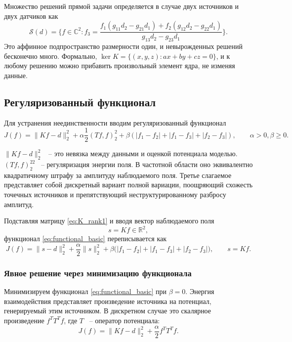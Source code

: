 \documentclass[a4paper,14pt,oneside,openany]{extarticle}
\begin{document}
Множество решений прямой задачи определяется в случае двух источников и двух датчиков как
\begin{equation}\label{eq:data_line}
    \mathcal{S}(d) = \{f\in\mathbb{C}^2: f_3 = \frac{f_1(g_{11}d_2 - g_{21}d_1) + f_2(g_{12}d_2 - g_{22}d_1)}{g_{13}d_2 - g_{23}d_1}\}.
\end{equation}
Это аффинное подпространство размерности один, и невырожденных решений бесконечно много. 
Формально, $\ker K = \{(x,y,z): a x + b y + c z = 0\}$, и к любому решению можно прибавить 
произвольный элемент ядра, не изменяя данные.

\subsection{Регуляризованный функционал}

Для устранения неединственности вводим регуляризованный функционал
\begin{equation}\label{eq:functional_basic}
    J(f) = \|K f - d\|_2^2 + \alpha \frac{1}{2} (Tf, f)_2^2 + \beta (|f_1 - f_2| + |f_1 - f_3| + |f_2 - f_3|),
    \qquad \alpha > 0, \beta \ge 0.
\end{equation}

$\|K f - d\|_2^2$ ~-- это невязка между данными и оценкой потенциала моделью. 
$(Tf, f)_2^22$ ~-- регуляризация энергии поля. В частотной области оно эквивалентно 
квадратичному штрафу за амплитуду наблюдаемого поля. Третье слагаемое представляет 
собой дискретный вариант полной вариации, поощряющий схожесть точечных источников 
и препятствующий неструктурированному разбросу амплитуд.

Подставляя матрицу \eqref{eq:K_rank1} и вводя вектор наблюдаемого поля
\begin{equation}\label{eq:field_observation}
    s = K f \in \mathbb{R}^2,
\end{equation}
функционал \eqref{eq:functional_basic} переписывается как
\begin{equation}\label{eq:functional_degenerate}
    J(f) = \|s - d\|_2^2 + \frac{\alpha}{2}\|s\|_2^2 + \beta \bigl(|f_1 - f_2| + |f_1 - f_3| + |f_2 - f_3|\bigr),
    \qquad s = Kf.
\end{equation}

\subsubsection{Явное решение через минимизацию функционала}

Минимизируем функционал \eqref{eq:functional_basic} при $\beta = 0$. 
Энергия взаимодействия представляет произведение источника на потенциал, 
генерируемый этим источником. В дискретном случае это скалярное 
произведение $f^T T^T f$, где $T$ ~-- оператор потенциала:
\begin{equation}
    J(f) = \|Kf - d\|_2^2 + \frac{\alpha}{2}f^T T^T f.
\end{equation}
\end{document}
